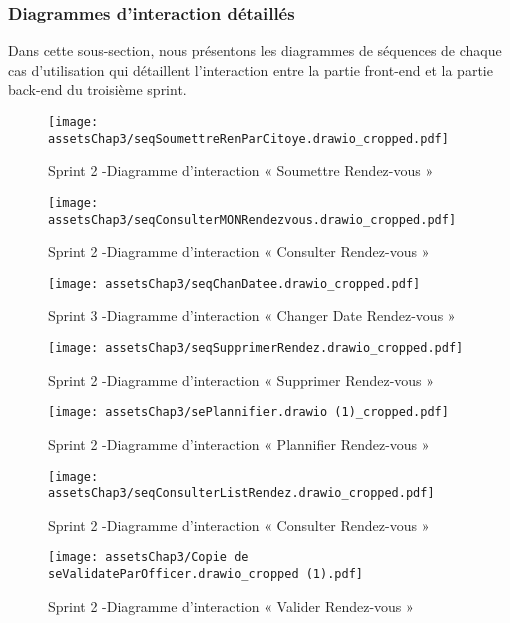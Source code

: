 \subsubsection{Diagrammes d’interaction détaillés}
Dans cette sous-section, nous présentons les diagrammes de séquences de chaque cas d'utilisation qui détaillent
l'interaction entre la partie front-end et la partie back-end du troisième sprint.
\\
\begin{figure}[H]
\centering
\texttt{[image: assetsChap3/seqSoumettreRenParCitoye.drawio\_cropped.pdf]}
\caption{ Sprint 2 -Diagramme d’interaction « Soumettre Rendez-vous » }
\end{figure}
\begin{figure}[H]
\centering
\texttt{[image: assetsChap3/seqConsulterMONRendezvous.drawio\_cropped.pdf]}
\caption{ Sprint 2 -Diagramme d’interaction « Consulter Rendez-vous » }
\end{figure}

\begin{figure}[H]
\centering
\texttt{[image: assetsChap3/seqChanDatee.drawio\_cropped.pdf]}
\caption{ Sprint 3 -Diagramme d’interaction « Changer Date Rendez-vous » }
\end{figure}

\begin{figure}[H]
\centering
\texttt{[image: assetsChap3/seqSupprimerRendez.drawio\_cropped.pdf]}
\caption{ Sprint 2 -Diagramme d’interaction « Supprimer Rendez-vous » }
\end{figure}


\begin{figure}[H]
\centering
\texttt{[image: assetsChap3/sePlannifier.drawio (1)\_cropped.pdf]}
\caption{ Sprint 2 -Diagramme d’interaction « Plannifier Rendez-vous » }
\end{figure}


\begin{figure}[H]
\centering
\texttt{[image: assetsChap3/seqConsulterListRendez.drawio\_cropped.pdf]}
\caption{ Sprint 2 -Diagramme d’interaction « Consulter Rendez-vous » }
\end{figure}

\begin{figure}[H]
\centering
\texttt{[image: assetsChap3/Copie de seValidateParOfficer.drawio\_cropped (1).pdf]}
\caption{ Sprint 2 -Diagramme d’interaction « Valider Rendez-vous » }
\end{figure}


